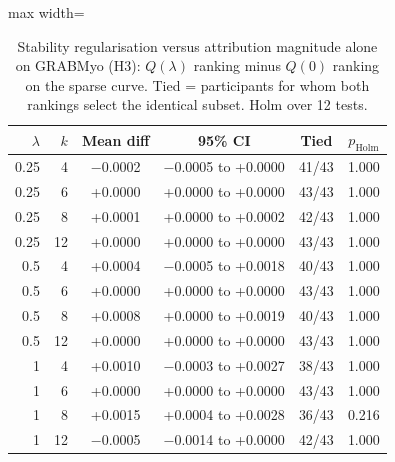 \begin{table}[t]
\centering
\small
\caption{Stability regularisation versus attribution magnitude alone on GRABMyo (H3): $Q(\lambda)$ ranking minus $Q(0)$ ranking on the sparse curve. Tied = participants for whom both rankings select the identical subset. Holm over 12 tests.}
\label{tab:lambda}
\setlength{\tabcolsep}{4pt}
\begin{adjustbox}{max width=\textwidth}
\begin{tabular}{rrcccc}
\toprule
$\lambda$ & $k$ & Mean diff & 95\% CI & Tied & $p_{\mathrm{Holm}}$ \\
\midrule
0.25 & 4 & $-$0.0002 & $-$0.0005 to +0.0000 & 41/43 & 1.000 \\
0.25 & 6 & +0.0000 & +0.0000 to +0.0000 & 43/43 & 1.000 \\
0.25 & 8 & +0.0001 & +0.0000 to +0.0002 & 42/43 & 1.000 \\
0.25 & 12 & +0.0000 & +0.0000 to +0.0000 & 43/43 & 1.000 \\
0.5 & 4 & +0.0004 & $-$0.0005 to +0.0018 & 40/43 & 1.000 \\
0.5 & 6 & +0.0000 & +0.0000 to +0.0000 & 43/43 & 1.000 \\
0.5 & 8 & +0.0008 & +0.0000 to +0.0019 & 40/43 & 1.000 \\
0.5 & 12 & +0.0000 & +0.0000 to +0.0000 & 43/43 & 1.000 \\
1 & 4 & +0.0010 & $-$0.0003 to +0.0027 & 38/43 & 1.000 \\
1 & 6 & +0.0000 & +0.0000 to +0.0000 & 43/43 & 1.000 \\
1 & 8 & +0.0015 & +0.0004 to +0.0028 & 36/43 & 0.216 \\
1 & 12 & $-$0.0005 & $-$0.0014 to +0.0000 & 42/43 & 1.000 \\
\bottomrule
\end{tabular}
\end{adjustbox}
\end{table}
